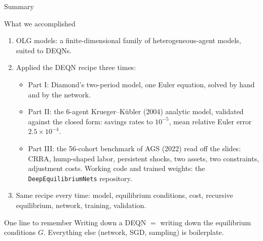 \documentclass[aspectratio=169,11pt]{beamer}
\newcommand{\emphc}[1]{\textcolor{harvardcrimson}{#1}}
\begin{document}
\begin{frame}{Summary}
\scriptsize
\begin{block}{What we accomplished}
\vspace{-2pt}\begin{enumerate}\itemsep0pt
    \item OLG models: a finite-dimensional family of heterogeneous-agent models, suited to DEQNs.
    \item Applied the DEQN recipe \emphc{three times}:
    \begin{itemize}\itemsep0pt
        \item \emphc{Part I\textonehalf:} Diamond's two-period model, one Euler equation, solved by hand and by the network.
        \item \emphc{Part II:} the 6-agent Krueger--K\"ubler (2004) analytic model, validated against the closed form: savings rates to $10^{-5}$, mean relative Euler error $2.5\times 10^{-4}$.
        \item \emphc{Part III:} the 56-cohort benchmark of AGS (2022) read off the slides: CRRA, hump-shaped labor, persistent shocks, two assets, two constraints, adjustment costs.  Working code and trained weights: the \texttt{DeepEquilibriumNets} repository.
    \end{itemize}
    \item \emphc{Same recipe} every time: model, equilibrium conditions, cost, recursive equilibrium, network, training, validation.
\end{enumerate}
\end{block}

\vspace{-2pt}
\begin{alertblock}{One line to remember}
\emphc{Writing down a DEQN $=$ writing down the equilibrium conditions $G$.}  Everything else (network, SGD, sampling) is boilerplate.
\end{alertblock}
\end{frame}
\end{document}
